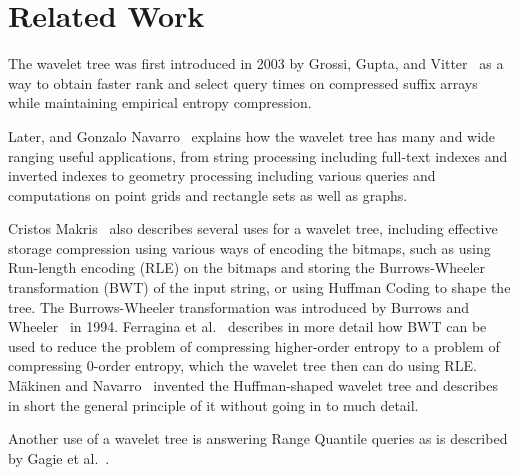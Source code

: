 \section{Related Work}
The wavelet tree was first introduced in 2003 by Grossi, Gupta, and Vitter~\cite[Section 4.2]{Grossi:2003:HET:644108.644250} as a way to obtain faster rank and select query times on compressed suffix arrays while maintaining empirical entropy compression.

Later, and Gonzalo Navarro~\cite{Navjda13} explains how the wavelet tree has many and wide ranging useful applications, from string processing including full-text indexes and inverted indexes to geometry processing including various queries and computations on point grids and rectangle sets as well as graphs.

Cristos Makris~\citep{WTSurvey} also describes several uses for a wavelet tree, including effective storage compression using various ways of encoding the bitmaps, such as using Run-length encoding (RLE) on the bitmaps and storing the Burrows-Wheeler transformation (BWT) of the input string, or using Huffman Coding to shape the tree.
The Burrows-Wheeler transformation was introduced by Burrows and Wheeler~\citep{BWToriginalArticle} in 1994.
Ferragina et al.~\citep{waveletTreeEntropy} describes in more detail how BWT can be used to reduce the problem of compressing higher-order entropy to a problem of compressing 0-order entropy, which the wavelet tree then can do using RLE.
Mäkinen and Navarro~\citep[Section~4]{FMcountOnBWT} invented the Huffman-shaped wavelet tree and describes in short the general principle of it without going in to much detail.

Another use of a wavelet tree is answering Range Quantile queries as is described by Gagie et al.~\citep[Section 3]{RangeQuantileQueries}.


